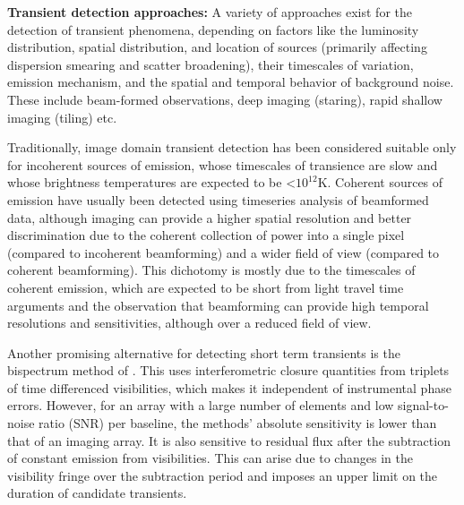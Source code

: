 \documentclass{aa}
\begin{document}
\begin{table}[tbhp]
\end{table}


\textbf{Transient detection  approaches:} A variety of approaches  exist for the
detection  of transient  phenomena,  depending on  factors  like the  luminosity
distribution, spatial distribution, and  location of sources (primarily affecting
dispersion  smearing and  scatter  broadening), their  timescales of  variation,
emission mechanism, and  the spatial and temporal behavior of background
noise.  These  include beam-formed observations, deep  imaging (staring), rapid
shallow imaging (tiling) etc.

Traditionally,  image domain  transient detection  has been  considered suitable
only for incoherent sources of emission, whose timescales of transience are slow
and  whose brightness  temperatures are  expected to  be  <$10^{12}$K.  Coherent
sources  of emission  have usually  been detected  using timeseries  analysis of
beamformed data,  although imaging can  provide a higher spatial  resolution and
better  discrimination due to  the coherent  collection of  power into  a single
pixel (compared to  incoherent beamforming) and a wider  field of view (compared
to coherent  beamforming).  This  dichotomy is mostly  due to the  timescales of
coherent  emission,  which are  expected  to be  short  from  light travel  time
arguments  and  the  observation  that  beamforming can  provide  high  temporal
resolutions and sensitivities, although over a reduced field of view.

Another  promising  alternative  for  detecting  short term  transients  is  the
bispectrum  method  of \citet{law2012all}.   This  uses interferometric  closure
quantities  from  triplets of  time  differenced  visibilities,  which makes  it
independent of  instrumental phase errors.  However,  for an array  with a large
number  of  elements and  low  signal-to-noise  ratio  (SNR) per  baseline,  the
methods' absolute  sensitivity is lower  than that of  an imaging array.   It is
also sensitive to residual flux  after the subtraction of constant emission from
visibilities.  This can  arise due to changes in the  visibility fringe over the
subtraction  period and  imposes an  upper limit  on the  duration  of candidate
transients.
\end{document}
